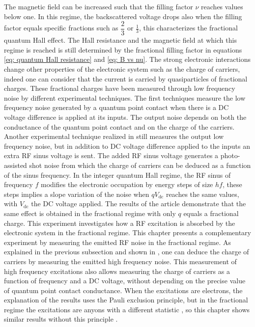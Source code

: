 The magnetic field can be increased such that the filling factor $\nu$ reaches values below one.
In this regime, the backscattered voltage drops also when the filling factor equals specific fractions such as $\dfrac{2}{3}$ or $\frac{1}{3}$, this characterizes the fractional quantum Hall effect.
The Hall resistance and the magnetic field at which this regime is reached is still determined by the fractional filling factor in equations \eqref{eq: quantum Hall resistance} and \eqref{eq: B vs nu}.
The strong electronic interactions change other properties of the electronic system such as the charge of carriers, indeed one can consider that the current is carried by quasiparticles of fractional charges.
These fractional charges have been measured through low frequency noise
by different experimental techniques.
The first techniques \cite{saminadayar1997observation,de1998direct,reznikov1999observation,bid2009shot,hashisaka2015shot} measure the low frequency noise generated by a quantum point contact when there is a DC voltage difference is applied at its inputs.
The output noise depends on both the conductance of the quantum point contact and on the charge of the carriers.
Another experimental technique realized in \cite{kapfer2019josephson,kapfer2018dynamic} still measures the output low frequency noise, but in addition to DC voltage difference applied to the inputs an extra RF sinus voltage is sent.
The added RF sinus voltage generates a photo-assisted shot noise from which the charge of carriers can be deduced as a function of the sinus frequency.
In the integer quantum Hall regime, the RF sinus of frequency $f$ modifies the electronic occupation by energy steps of size $hf$, these steps implies a slope variation of the noise when $qV_{\mathrm{dc}}$ reaches the same values, with $V_{\mathrm{dc}}$ the DC voltage applied.
The results of the article \cite{kapfer2019josephson} demonstrate that the same effect is obtained in the fractional regime with only $q$ equals a fractional charge.
This experiment investigates how a RF excitation is absorbed by the electronic system in the fractional regime.
This chapter presents a complementary experiment by measuring the emitted RF noise in the fractional regime.
As explained in the previous subsection and shown in \cite{schoelkopf1997frequency,zakka2007experimental,gabelli2009high}, one can deduce the charge of carriers by measuring the emitted high frequency noise.
This measurement of high frequency excitations also allows measuring the charge of carriers as a function of frequency and a DC voltage, without depending on the precise value of quantum point contact conductance.
When the excitations are electrons, the explanation of the results uses the Pauli exclusion principle, but in the fractional regime the excitations are anyons with a different statistic \cite{arovas1984fractional,halperin1984statistics,bartolomei2020fractional,nakamura2020direct}, so this chapter shows similar results without this principle \cite{haldane1991fractional}.



